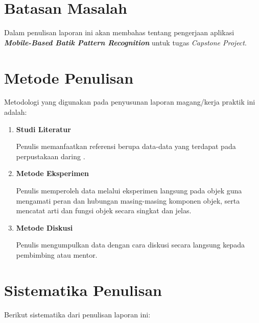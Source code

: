 \section{Batasan Masalah}

Dalam penulisan laporan ini akan membahas tentang pengerjaan aplikasi \textbf{\textit{Mobile-Based Batik Pattern Recognition}} untuk tugas \textit{Capstone Project}.

\section{Metode Penulisan}

Metodologi yang digunakan pada penyusunan laporan magang/kerja praktik ini adalah:

\begin{enumerate}[nolistsep]

  \item \textbf{Studi Literatur}

  Penulis memanfaatkan referensi berupa data-data yang terdapat pada perpustakaan daring \cite{gultom2018batik}.

  \item \textbf{Metode Eksperimen}

  Penulis memperoleh data melalui eksperimen langsung pada objek guna mengamati peran dan hubungan masing-masing komponen objek, serta mencatat arti dan fungsi objek secara singkat dan jelas.

  \item \textbf{Metode Diskusi}

  Penulis mengumpulkan data dengan cara diskusi secara langsung kepada pembimbing atau mentor.

\end{enumerate}

\section{Sistematika Penulisan}

Berikut sistematika dari penulisan laporan ini:

